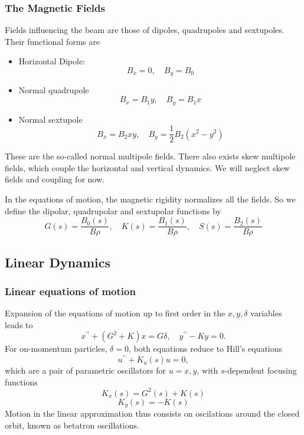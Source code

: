 \subsubsection{The Magnetic Fields}
Fields influencing the beam are those of dipoles, quadrupoles and sextupoles.
Their functional forms are
\begin{itemize}
    \item Horizontal Dipole:\\
           $$ B_x = 0, \quad B_y = B_0$$
    \item Normal quadrupole\\
          $$B_x = B_1 y, \quad B_y = B_1 x$$
    \item Normal sextupole\\
          $$B_x = B_2xy, \quad B_y = \frac{1}{2}B_2(x^2 - y^2)$$
\end{itemize}
These are the so-called normal multipole fields. There also exists skew multipole fields, which couple the horizontal and vertical dynamics. We will neglect skew fields and coupling for now.

In the equations of motion, the magnetic rigidity normalizes all the fields. So we define the dipolar, quadrupolar and sextupolar functions by
$$G(s) = \frac{B_0(s)}{B\rho}, \quad K(s) = \frac{B_1(s)}{B\rho}, \quad S(s) = \frac{B_2(s)}{B\rho}$$

\subsection{Linear Dynamics}
\subsubsection{Linear equations of motion}
Expansion of the equations of motion up to first order in the $x, y, \delta$ variables leads to \cite{sands}
    \begin{equation}
        x^{\prime\prime}+(G^2+K)x=G\delta, \quad
        y^{\prime\prime}-Ky=0.
        \label{eq:linearEOM}
    \end{equation}
    For on-momentum particles, $\delta=0$, both equations reduce to Hill's equations
    \begin{equation}
        u^{\prime\prime}+K_u(s)u = 0,
        \label{eq:Hill}
    \end{equation}
    which are a pair of parametric oscillators for $u=x,y$, with $s$-dependent focusing functions
         $$K_x(s) = G^2(s) + K(s)$$ $$K_y(s) = - K(s)$$
Motion in the linear approximation thus consists on oscilations around the closed orbit, known as betatron oscillations.
